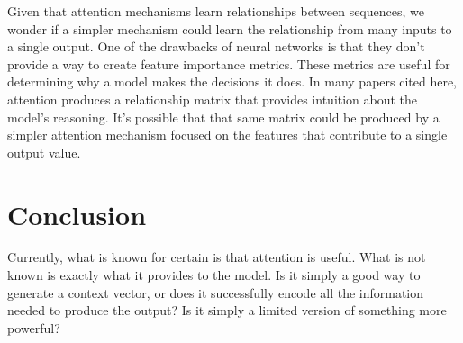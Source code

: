 \documentclass{article}
\begin{document}
Given that attention mechanisms learn relationships between sequences, we wonder if a simpler mechanism could learn the relationship from many inputs to a single output. One of the drawbacks of neural networks is that they don't provide a way to create feature importance metrics. These metrics are useful for determining why a model makes the decisions it does. In many papers cited here, attention produces a relationship matrix that provides intuition about the model's reasoning. It's possible that that same matrix could be produced by a simpler attention mechanism focused on the features that contribute to a single output value.

\section{Conclusion}

Currently, what is known for certain is that attention is useful. What is not known is exactly what it provides to the model. Is it simply a good way to generate a context vector, or does it successfully encode all the information needed to produce the output? Is it simply a limited version of something more powerful?



\end{document}
